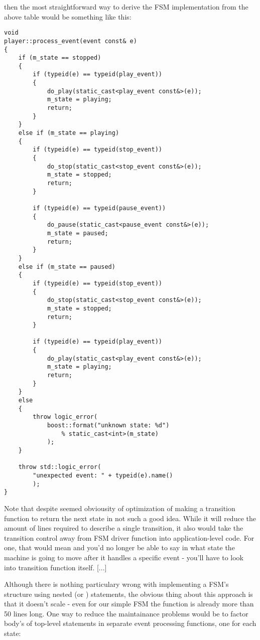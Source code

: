 \documentclass{netobjectdays}
\begin{document}
then the most straightforward way to derive the FSM 
implementation from the above table would be something 
like this:

{\footnotesize
\begin{verbatim}
void
player::process_event(event const& e)
{
    if (m_state == stopped)
    {
        if (typeid(e) == typeid(play_event))
        {
            do_play(static_cast<play_event const&>(e));
            m_state = playing;
            return;
        }
    }
    else if (m_state == playing)
    {
        if (typeid(e) == typeid(stop_event))
        {
            do_stop(static_cast<stop_event const&>(e));
            m_state = stopped;
            return;
        }

        if (typeid(e) == typeid(pause_event))
        {
            do_pause(static_cast<pause_event const&>(e));
            m_state = paused;
            return;
        }
    }
    else if (m_state == paused)
    {
        if (typeid(e) == typeid(stop_event))
        {
            do_stop(static_cast<stop_event const&>(e));
            m_state = stopped;
            return;
        }

        if (typeid(e) == typeid(play_event))
        {
            do_play(static_cast<play_event const&>(e));
            m_state = playing;
            return;
        }
    }
    else
    {
        throw logic_error(
            boost::format("unknown state: %d")
                % static_cast<int>(m_state)
            );
    }

    throw std::logic_error(
        "unexpected event: " + typeid(e).name()
        );
}
\end{verbatim}
}

Note that despite seemed obviousity of optimization of making 
a transition function to return the next state in not such a 
good idea. While it will reduce the amount of lines required 
to describe a single transition, it also would take the 
transition control away from FSM driver function into 
application-level code. For one, that would mean and you'd no 
longer be able to say in what state the machine is going to 
move after it handles a specific event - you'll have to look 
into transition function itself. [...] 

Although there is nothing particulary wrong with implementing 
a FSM's structure using nested  (or )
statements, the obvious thing about this approach is that it 
doesn't scale - even for our simple FSM the 
 function is already more than 50 lines
long. One way to reduce the maintainance problems would be to 
factor body's of top-level  statements in separate 
event processing functions, one for each state:
\end{document}
